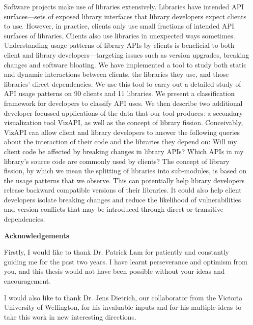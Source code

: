 Software projects make use of libraries extensively. Libraries have intended API surfaces—sets of exposed library interfaces that library developers expect clients to use. However, in practice, clients only use small fractions of intended API surfaces of libraries. Clients also use libraries in unexpected ways sometimes. Understanding usage patterns of library APIs by clients is beneficial to both client and library developers—targeting issues such as version upgrades, breaking changes and software bloating. We have implemented a tool to study both static and dynamic interactions between clients, the libraries they use, and those libraries’ direct dependencies. We use this tool to carry out a detailed study of API usage patterns on 90 clients and 11 libraries. We present a classification framework for developers to classify API uses. We then describe two additional developer-focussed applications of the data that our tool produces: a secondary visualization tool VizAPI, as well as the concept of library fission. Conceivably, VizAPI can allow client and library developers to answer the following queries about the interaction of their code and the libraries they depend on: Will my client code be affected by breaking changes in library APIs? Which APIs in my library's source code are commonly used by clients? The concept of library fission, by which we mean the splitting of libraries into sub-modules, is based on the usage patterns that we observe. This can potentially help library developers release backward compatible versions of their libraries. It could also help client developers isolate breaking changes and reduce the likelihood of vulnerabilities and version conflicts that may be introduced through direct or transitive dependencies. 

\cleardoublepage


\begin{center}\textbf{Acknowledgements}\end{center}
Firstly, I would like to thank Dr. Patrick Lam for patiently and constantly guiding me for the past two years. I have learnt perseverance and optimism from you, and this thesis would not have been possible without your ideas and encouragement.

I would also like to thank Dr. Jens Dietrich, our collaborator from the Victoria University of Wellington, for his invaluable inputs and for his multiple ideas to take this work in new interesting directions.


